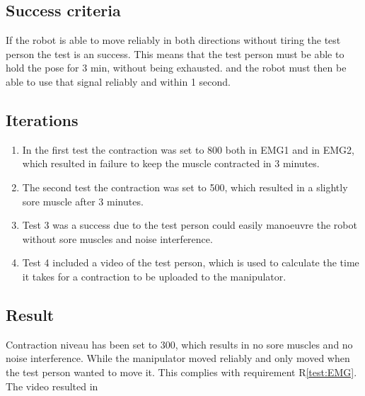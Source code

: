 \subsection*{Success criteria}
 If the robot is able to  move reliably in both directions without tiring the test person the test is an success. This means that the test person must be able to hold the pose for 3 min, without being exhausted. and the robot must then be able to use that signal reliably and within 1 second.
\subsection*{Iterations}
\begin{enumerate}
    \item In the first test the contraction was set to 800 both in EMG1 and in EMG2, which resulted in failure to keep the muscle contracted in 3 minutes.
    \item The second test the contraction was set to 500, which resulted in a slightly sore muscle after 3 minutes.
    \item Test 3 was a success due to the test person could easily manoeuvre the robot without sore muscles and noise interference. 
    \item Test 4 included a video of the test person, which is used to calculate the time it takes for a contraction to be uploaded to the manipulator.
\end{enumerate}
\subsection*{Result}
Contraction niveau has been set to 300, which results in no sore muscles and no noise interference. While the manipulator moved reliably and only moved when the test person wanted to move it. This complies with requirement R\ref{test:EMG}.\\
The video resulted in 
\newpage
